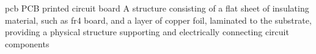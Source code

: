 \newglsXacronym%
{pcb}%
{PCB}%
{printed circuit board}%
{A structure consisting of a flat sheet of insulating material, such as \gls{fr4} board, and a layer of copper foil, laminated to the substrate, providing a physical structure supporting and electrically connecting circuit components}%